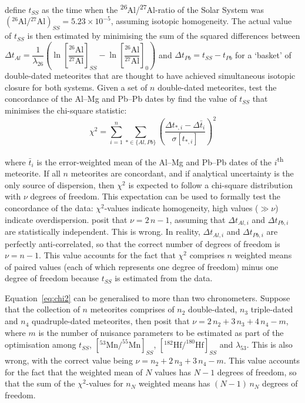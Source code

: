 \documentclass{article}
\begin{document}
\citet{desch2023a} define $t_{\mathit{SS}}$ as the time when the
\textsuperscript{26}Al/\textsuperscript{27}Al-ratio of the Solar
System was
$({}^{26}\mbox{Al}/{}^{27}\mbox{Al})_{\mathit{SS}}={5.23}\times{10}^{-5}$,
assuming isotopic homogeneity. The actual value of $t_{\mathit{SS}}$ is then
estimated by minimising the sum of the squared differences between
$\Delta{t}_{Al} = \dfrac{1}{\lambda_{26}} \left(
\ln\left[\dfrac{{}^{26}\mbox{Al}}{{}^{27}\mbox{Al}}\right]_{\mathit{SS}} -
\ln\left[\dfrac{{}^{26}\mbox{Al}}{{}^{27}\mbox{Al}}\right]_{0} \right)
$ and $\Delta{t}_{Pb} = t_{\mathit{SS}} - t_{Pb}$ for a `basket' of
double-dated meteorites that are thought to have achieved simultaneous
isotopic closure for both systems. Given a set of $n$ double-dated
meteorites, \citet{desch2023a} test the concordance of the Al--Mg and
Pb--Pb dates by find the value of $t_{\mathit{SS}}$ that minimises the
chi-square statistic:
\begin{equation}
  \chi^2 = \sum\limits_{i=1}^{n}\sum\limits_{\ast\in\{Al,Pb\}}
  \left(\dfrac{\Delta t_{\ast,i}-\Delta\bar{t}_i}{\sigma\left[t_{\ast,i}\right]}\right)^2
  \label{eq:chi2}
\end{equation}

\noindent where $\bar{t}_i$ is the error-weighted mean of the Al--Mg
and Pb--Pb dates of the $i$\textsuperscript{th} meteorite. If all $n$
meteorites are concordant, and if analytical uncertainty is the only
source of dispersion, then $\chi^2$ is expected to follow a chi-square
distribution with $\nu$ degrees of freedom. This expectation can be
used to formally test the concordance of the data: $\chi^2$-values
indicate homogeneity, high values ($\gg\nu$) indicate overdispersion.
\citet{desch2023a} posit that $\nu = 2\,n-1$, assuming that
$\Delta{t}_{Al,i}$ and $\Delta{t}_{Pb,i}$ are statistically
independent. This is wrong. In reality, $\Delta{t}_{Al,i}$ and
$\Delta{t}_{Pb,i}$ are perfectly anti-correlated, so that the correct
number of degrees of freedom is $\nu = n-1$. This value accounts for
the fact that $\chi^2$ comprises $n$ weighted means of paired values
(each of which represents one degree of freedom) minus one degree of
freedom because $t_{\mathit{SS}}$ is estimated from the data.\medskip

Equation~\ref{eq:chi2} can be generalised to more than two
chronometers.  Suppose that the collection of $n$ meteorites comprises
of $n_2$ double-dated, $n_3$ triple-dated and $n_4$ quadruple-dated
meteorites, then \citet{desch2023b} posit that $\nu = 2\,n_2 + 3\,n_3
+ 4\,n_4 - m$, where $m$ is the number of nuisance parameters to be
estimated as part of the optimisation among $t_{\mathit{SS}}$,
$\left[^{53}\mbox{Mn}/^{55}\mbox{Mn}\right]_{\mathit{SS}}$,
$\left[^{182}\mbox{Hf}/^{180}\mbox{Hf}\right]_{\mathit{SS}}$ and
$\lambda_{53}$. This is also wrong, with the correct value being $\nu
= n_2 + 2\,n_3 + 3\,n_4 - m$. This value accounts for the fact that
the weighted mean of $N$ values has $N-1$ degrees of freedom, so that
the sum of the $\chi^2$-values for $n_N$ weighted means has $(N-1)
\,n_N$ degrees of freedom.
\end{document}
